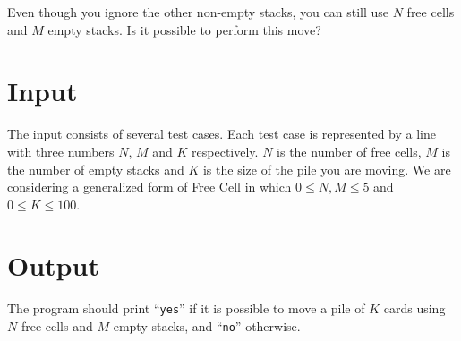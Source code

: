 Even though you ignore the other non-empty stacks, you can still use $N$ free cells and $M$ empty
stacks. Is it possible to perform this move?

\section*{Input}
The input consists of several test cases. Each test case is represented by a line with three numbers
$N$, $M$ and $K$ respectively. $N$ is the number of free cells, $M$ is the number of empty stacks
and $K$ is the size of the pile you are moving. We are considering a generalized form of Free Cell
in which $0 \leq N, M \leq 5$ and $0 \leq K \leq 100$.

\section*{Output}
The program should print ``\verb|yes|'' if it is possible to move a pile of $K$ cards using $N$ free
cells and $M$ empty stacks, and ``\verb|no|'' otherwise.
